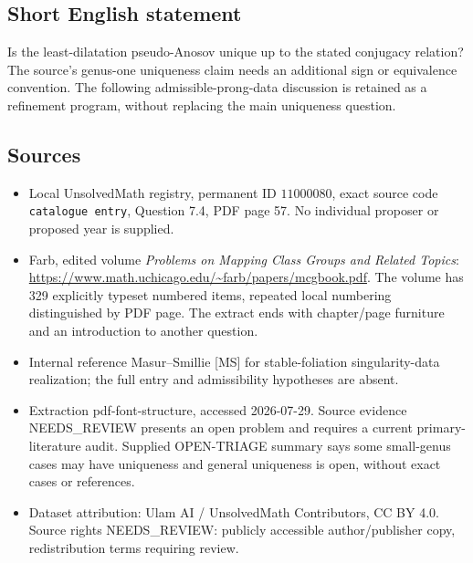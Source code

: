 \documentclass[11pt]{article}
\begin{document}
\subsection{Short English statement}
Is the least-dilatation pseudo-Anosov unique up to the stated conjugacy relation? The source's genus-one uniqueness claim needs an additional sign or equivalence convention. The following admissible-prong-data discussion is retained as a refinement program, without replacing the main uniqueness question.
\subsection{Sources}
\begin{itemize}
\item Local UnsolvedMath registry, permanent ID \(11000080\), exact source code \texttt{catalogue entry}, Question 7.4, PDF page 57. No individual proposer or proposed year is supplied.
\item Farb, edited volume \emph{Problems on Mapping Class Groups and Related Topics}: \url{https://www.math.uchicago.edu/~farb/papers/mcgbook.pdf}. The volume has 329 explicitly typeset numbered items, repeated local numbering distinguished by PDF page. The extract ends with chapter/page furniture and an introduction to another question.
\item Internal reference Masur--Smillie [MS] for stable-foliation singularity-data realization; the full entry and admissibility hypotheses are absent.
\item Extraction pdf-font-structure, accessed 2026-07-29. Source evidence NEEDS\_REVIEW presents an open problem and requires a current primary-literature audit. Supplied OPEN-TRIAGE summary says some small-genus cases may have uniqueness and general uniqueness is open, without exact cases or references.
\item Dataset attribution: Ulam AI / UnsolvedMath Contributors, CC BY 4.0. Source rights NEEDS\_REVIEW: publicly accessible author/publisher copy, redistribution terms requiring review.
\end{itemize}
\end{document}
